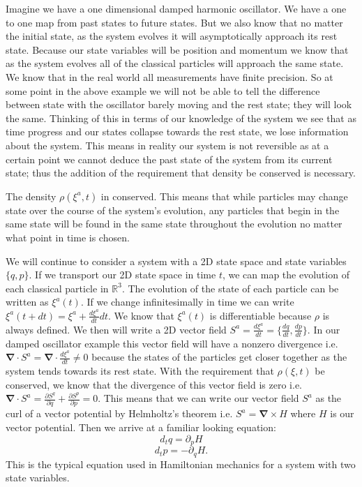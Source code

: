 \documentclass{article}
\begin{document}
	Imagine we have a one dimensional damped harmonic oscillator. We have a one to one map from past states to future states. But we also know that no matter the initial state, as the system evolves it will asymptotically approach its rest state. Because our state variables will be position and momentum we know that as the system evolves all of the classical particles will approach the same state. We know that in the real world all measurements have finite precision. So at some point in the above example we will not be able to tell the difference between state with the oscillator barely moving and the rest state; they will look the same. Thinking of this in terms of our knowledge of the system we see that as time progress and our states collapse towards the rest state, we lose information about the system. This means in reality our system is not reversible as at a certain point we cannot deduce the past state of the system from its current state; thus the addition of the requirement that density be conserved is necessary.

\begin{prop}
	The density $\rho(\xi^a,t)$ in conserved. This means that while particles may change state over the course of the system's evolution, any particles that begin in the same state will be found in the same state throughout the evolution no matter what point in time is chosen.
\end{prop}

	We will continue to consider a system with a 2D state space and state variables $\{q,p \}$. If we transport our 2D state space in time $t$, we can map the evolution of each classical particle in $\mathbb{R}^3$. The evolution of the state of each particle can be written as $\xi^a(t)$. If we change infinitesimally in time we can write $\xi^a(t + dt) = \xi^a + \frac{d\xi^a}{dt}dt$. We know that $\xi^a(t)$ is differentiable because $\rho$ is always defined. We then will write a 2D vector field $S^a =\frac{d\xi^a}{dt} = \{\frac{dq}{dt},\frac{dp}{dt} \}$. In our damped oscillator example this vector field will have a nonzero divergence i.e. $\mathbf{\nabla} \cdot S^a =\mathbf{\nabla} \cdot \frac{d\xi^a}{dt} \neq 0$ because the states of the particles get closer together as the system tends towards its rest state. With the requirement that $\rho(\xi,t)$ be conserved, we know that the divergence of this vector field is zero i.e. $\mathbf{\nabla} \cdot S^a = \frac{\partial S^q}{\partial q} + \frac{\partial S^p}{\partial p} = 0$. This means that we can write our vector field $S^a$ as the curl of a vector potential by Helmholtz's theorem i.e. $S^a = \mathbf{\nabla} \times H$ where $H$ is our vector potential. Then we arrive at a familiar looking equation: $$d_t q = \partial _{p} H$$ $$d_t p = -\partial _q H.$$ This is the typical equation used in Hamiltonian mechanics for a system with two state variables.
	
\end{document}
